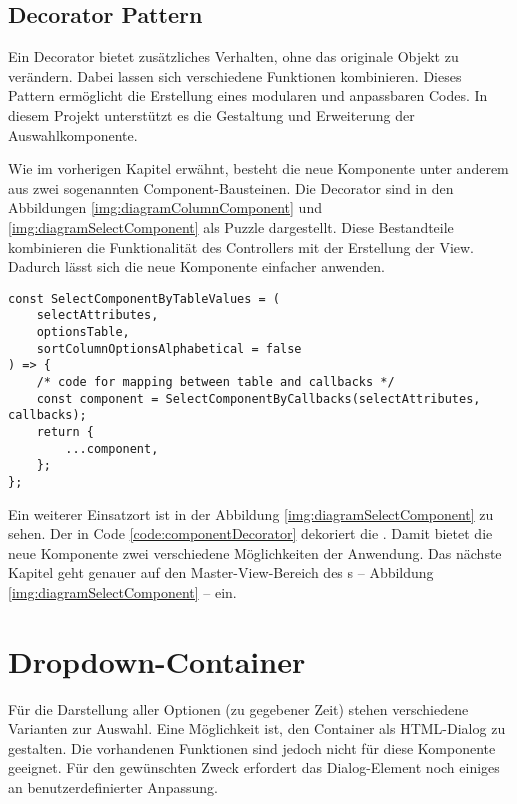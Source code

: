 \subsection{Decorator Pattern}
\label{sec:decoratorPattern}

Ein Decorator bietet zusätzliches Verhalten, ohne das originale Objekt zu verändern. 
Dabei lassen sich verschiedene Funktionen kombinieren. 
Dieses Pattern ermöglicht die Erstellung eines modularen und anpassbaren Codes. 
In diesem Projekt unterstützt es die Gestaltung und Erweiterung der Auswahlkomponente. 

Wie im vorherigen Kapitel erwähnt, besteht die neue Komponente unter anderem aus zwei sogenannten Component-Bausteinen. 
Die Decorator sind in den Abbildungen \ref{img:diagramColumnComponent} und \ref{img:diagramSelectComponent} als Puzzle dargestellt. 
Diese Bestandteile kombinieren die Funktionalität des Controllers mit der Erstellung der View. 
Dadurch lässt sich die neue Komponente einfacher anwenden. 

\begin{lstlisting}[style = htmlcssjs, caption = \codestyle{SelectComponentByTableValues} dekoriert \codestyle{SelectComponentByCallbacks}, label = code:componentDecorator]
const SelectComponentByTableValues = (
    selectAttributes,
    optionsTable,
    sortColumnOptionsAlphabetical = false
) => {
    /* code for mapping between table and callbacks */
    const component = SelectComponentByCallbacks(selectAttributes, callbacks);
    return {
        ...component,
    };
};
\end{lstlisting}

Ein weiterer Einsatzort ist in der Abbildung \ref{img:diagramSelectComponent} zu sehen.
Der  in Code \ref{code:componentDecorator} dekoriert die . 
Damit bietet die neue Komponente zwei verschiedene Möglichkeiten der Anwendung. 
Das nächste Kapitel geht genauer auf den Master-View-Bereich des s – Abbildung \ref{img:diagramSelectComponent} – ein. 


\section{Dropdown-Container}
\label{sec:dropdownContainer}

Für die Darstellung aller Optionen (zu gegebener Zeit) stehen verschiedene Varianten zur Auswahl. 
Eine Möglichkeit ist, den Container als HTML-Dialog zu gestalten. 
Die vorhandenen Funktionen sind jedoch nicht für diese Komponente geeignet. 
Für den gewünschten Zweck erfordert das Dialog-Element noch einiges an benutzerdefinierter Anpassung. 

